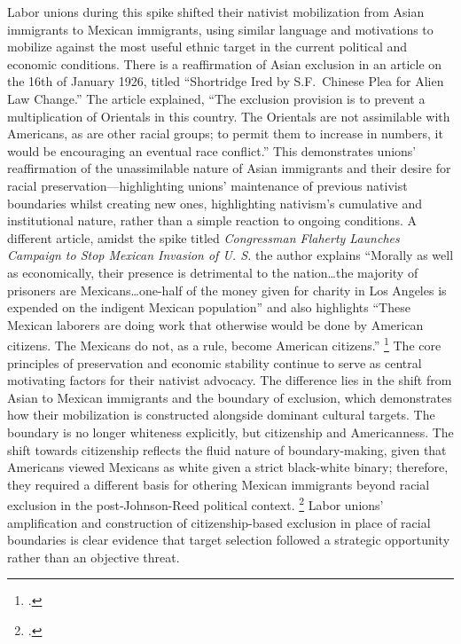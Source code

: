 \documentclass[12pt,a4paper]{article}
\begin{document}
Labor unions during this spike shifted their nativist mobilization from Asian immigrants to Mexican immigrants, using similar language and motivations to mobilize against the most useful ethnic target in the current political and economic conditions. There is a reaffirmation of Asian exclusion in an article on the 16th of January 1926, titled ``Shortridge Ired by S.F.\ Chinese Plea for Alien Law Change.'' The article explained, ``The exclusion provision is to prevent a multiplication of Orientals in this country. The Orientals are not assimilable with Americans, as are other racial groups; to permit them to increase in numbers, it would be encouraging an eventual race conflict.'' This demonstrates unions' reaffirmation of the unassimilable nature of Asian immigrants and their desire for racial preservation---highlighting unions' maintenance of previous nativist boundaries whilst creating new ones, highlighting nativism’s cumulative and institutional nature, rather than a simple reaction to ongoing conditions. A different article, amidst the spike titled \textit{Congressman Flaherty Launches Campaign to Stop Mexican Invasion of U. S.} the author explains ``Morally as well as economically, their presence is detrimental to the nation\ldots the majority of prisoners are Mexicans\ldots one-half of the money given for charity in Los Angeles is expended on the indigent Mexican population'' and also highlights ``These Mexican laborers are doing work that otherwise would be done by American citizens. The Mexicans do not, as a rule, become American citizens.'' \footcite{ely_congressman_1925} The core principles of preservation and economic stability continue to serve as central motivating factors for their nativist advocacy. The difference lies in the shift from Asian to Mexican immigrants and the boundary of exclusion, which demonstrates how their mobilization is constructed alongside dominant cultural targets. The boundary is no longer whiteness explicitly, but citizenship and Americanness. The shift towards citizenship reflects the fluid nature of boundary-making, given that Americans viewed Mexicans as white given a strict black-white binary; therefore, they required a different basis for othering Mexican immigrants beyond racial exclusion in the post-Johnson-Reed political context. \footcite{menchaca_recovering_2001} Labor unions' amplification and construction of citizenship-based exclusion in place of racial boundaries is clear evidence that target selection followed a strategic opportunity rather than an objective threat. 
\newpage
\end{document}
